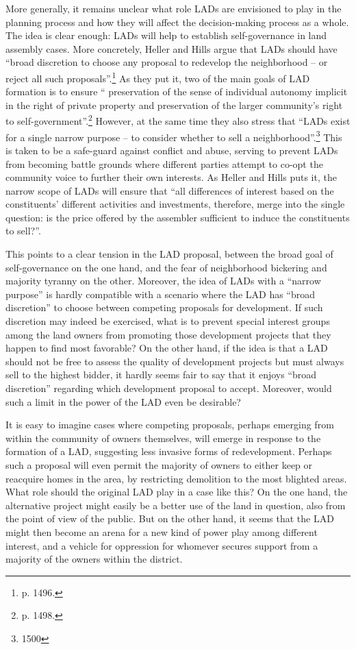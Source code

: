 More generally, it remains unclear what role LADs are envisioned to play in the planning process and how they will affect the decision-making process as a whole. The idea is clear enough: LADs will help to establish self-governance in land assembly cases. More concretely, Heller and Hills argue that LADs should have ``broad discretion to choose any proposal to redevelop the neighborhood -- or reject all such proposals''.\footnote{p. 1496.} As they put it, two of the main goals of LAD formation is to ensure `` preservation of the sense of individual autonomy implicit in the right of private property and preservation of the larger community’s right to self-government''.\footnote{p. 1498.} However, at the same time they also stress that ``LADs exist for a single narrow purpose -- to consider whether to sell a neighborhood''.\footnote{1500} This is taken to be a safe-guard against conflict and abuse, serving to prevent LADs from becoming battle grounds where different parties attempt to co-opt the community voice to further their own interests. As Heller and Hills puts it, the narrow scope of LADs will ensure that ``all differences of interest based on the constituents' different activities and investments, therefore, merge into the single question: is the price offered by the assembler sufficient to induce the constituents to sell?''.

This points to a clear tension in the LAD proposal, between the broad goal of self-governance on the one hand, and the fear of neighborhood bickering and majority tyranny on the other. Moreover, the idea of LADs with a ``narrow purpose'' is hardly compatible with a scenario where the LAD has ``broad discretion'' to choose between competing proposals for development. If such discretion may indeed be exercised, what is to prevent special interest groups among the land owners from promoting those development projects that they happen to find most favorable? On the other hand, if the idea is that a LAD should not be free to assess the quality of development projects but must always sell to the highest bidder, it hardly seems fair to say that it enjoys ``broad discretion'' regarding which development proposal to accept. Moreover, would such a limit in the power of the LAD even be desirable? 

It is easy to imagine cases where competing proposals, perhaps emerging from within the community of owners themselves, will emerge in response to the formation of a LAD, suggesting less invasive forms of redevelopment. Perhaps such a proposal will even permit the majority of owners to either keep or reacquire homes in the area, by restricting demolition to the most blighted areas. What role should the original LAD play in a case like this? On the one hand, the alternative project might easily be a better use of the land in question, also from the point of view of the public. But on the other hand, it seems that the LAD might then become an arena for a new kind of power play among different interest, and a vehicle for oppression for whomever secures support from a majority of the owners within the district. 

